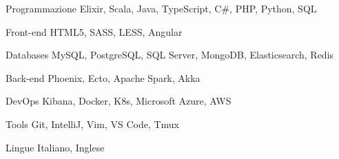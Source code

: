 \documentclass{resume} %
\begin{document}
\begin{cvSkills}


  \cvSkill
    {Programmazione}
    {Elixir, Scala, Java, TypeScript, C\#, PHP, Python, SQL}


  \cvSkill
    {Front-end}
    {HTML5, SASS, LESS, Angular}


  \cvSkill
    {Databases}
    {MySQL, PostgreSQL, SQL Server, MongoDB, Elasticsearch, Redis}


  \cvSkill
    {Back-end}
    {Phoenix, Ecto, Apache Spark, Akka}


  \cvSkill
    {DevOps}
    {Kibana, Docker, K8s, Microsoft Azure, AWS}


  \cvSkill
    {Tools}
    {Git, IntelliJ, Vim, VS Code, Tmux}


  \cvSkill
    {}{}


  \cvSkill
    {Lingue}
    {Italiano, Inglese}


\end{cvSkills}



\end{document}
